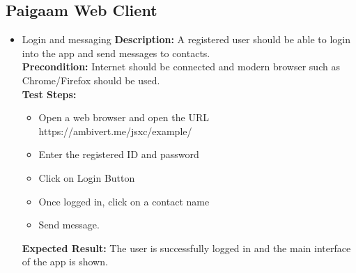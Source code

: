 \subsection{Paigaam Web Client}
\begin{itemize}
\item
Login and messaging
\noindent \textbf{Description:}
A registered user should be able to login into the app and send messages to contacts.\\
\noindent \textbf{Precondition:}
Internet should be connected and modern browser such as Chrome/Firefox should be used.\\
\noindent \textbf{Test Steps:}
\begin{itemize}
\item Open a web browser and open the URL https://ambivert.me/jsxc/example/
\item Enter the registered ID and password
\item Click on Login Button
\item Once logged in, click on a contact name
\item Send message.
\end{itemize}
\noindent \textbf{Expected Result:}
The user is successfully logged in and the main interface of the app is shown.\\


\end{itemize}
